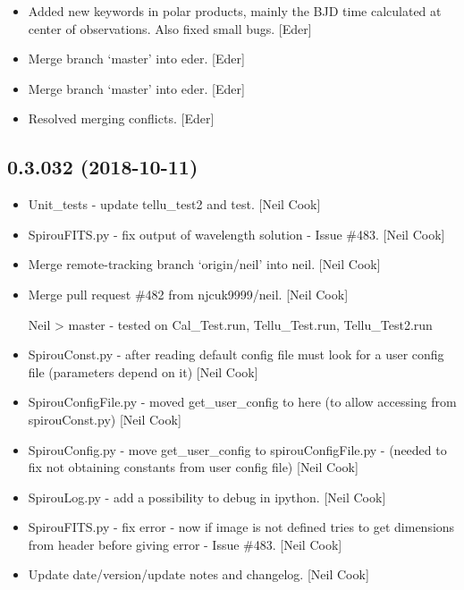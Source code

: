 \documentclass[a4paper,10pt,english]{report}
\begin{document}
\begin{itemize}
\item {} 
Added new keywords in polar products, mainly the BJD time calculated
at center of observations. Also fixed small bugs. {[}Eder{]}

\item {} 
Merge branch ‘master’ into eder. {[}Eder{]}

\item {} 
Merge branch ‘master’ into eder. {[}Eder{]}

\item {} 
Resolved merging conflicts. {[}Eder{]}

\end{itemize}


\subsection{0.3.032 (2018-10-11)}
\label{\detokenize{misc/changelog:id297}}\begin{itemize}
\item {} 
Unit\_tests - update tellu\_test2 and test. {[}Neil Cook{]}

\item {} 
SpirouFITS.py - fix output of wavelength solution - Issue \#483. {[}Neil
Cook{]}

\item {} 
Merge remote-tracking branch ‘origin/neil’ into neil. {[}Neil Cook{]}

\item {} 
Merge pull request \#482 from njcuk9999/neil. {[}Neil Cook{]}

Neil \textendash{}\textgreater{} master - tested on Cal\_Test.run, Tellu\_Test.run, Tellu\_Test2.run

\item {} 
SpirouConst.py - after reading default config file must look for a
user config file (parameters depend on it) {[}Neil Cook{]}

\item {} 
SpirouConfigFile.py - moved get\_user\_config to here (to allow
accessing from spirouConst.py) {[}Neil Cook{]}

\item {} 
SpirouConfig.py - move get\_user\_config to spirouConfigFile.py -
(needed to fix not obtaining constants from user config file) {[}Neil
Cook{]}

\item {} 
SpirouLog.py - add a possibility to debug in ipython. {[}Neil Cook{]}

\item {} 
SpirouFITS.py - fix error - now if image is not defined tries to get
dimensions from header before giving error - Issue \#483. {[}Neil Cook{]}

\item {} 
Update date/version/update notes and changelog. {[}Neil Cook{]}

\end{itemize}
\end{document}
